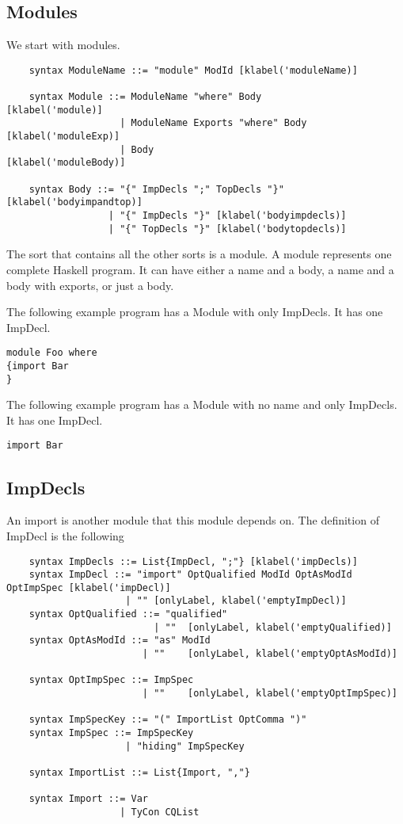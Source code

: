 \subsection{Modules}
We start with modules.
\begin{lstlisting}
    syntax ModuleName ::= "module" ModId [klabel('moduleName)]

    syntax Module ::= ModuleName "where" Body          [klabel('module)]
                    | ModuleName Exports "where" Body  [klabel('moduleExp)]
                    | Body                             [klabel('moduleBody)]

    syntax Body ::= "{" ImpDecls ";" TopDecls "}" [klabel('bodyimpandtop)]
                  | "{" ImpDecls "}" [klabel('bodyimpdecls)]
                  | "{" TopDecls "}" [klabel('bodytopdecls)]
\end{lstlisting}

The sort that contains all the other sorts is a module. A module represents one complete Haskell program. It can have either a name and a body, a name and a body with exports, or just a body.

The following example program has a Module with only ImpDecls. It has one ImpDecl.

\begin{lstlisting}
module Foo where
{import Bar
}
\end{lstlisting}

The following example program has a Module with no name and only ImpDecls. It has one ImpDecl.

\begin{lstlisting}
import Bar
\end{lstlisting}

\subsection{ImpDecls}
An import is another module that this module depends on.
The definition of ImpDecl is the following
\begin{lstlisting}
    syntax ImpDecls ::= List{ImpDecl, ";"} [klabel('impDecls)]
    syntax ImpDecl ::= "import" OptQualified ModId OptAsModId OptImpSpec [klabel('impDecl)]
                     | "" [onlyLabel, klabel('emptyImpDecl)]
    syntax OptQualified ::= "qualified"
                          | ""  [onlyLabel, klabel('emptyQualified)]
    syntax OptAsModId ::= "as" ModId
                        | ""    [onlyLabel, klabel('emptyOptAsModId)]

    syntax OptImpSpec ::= ImpSpec
                        | ""    [onlyLabel, klabel('emptyOptImpSpec)]

    syntax ImpSpecKey ::= "(" ImportList OptComma ")"
    syntax ImpSpec ::= ImpSpecKey
                     | "hiding" ImpSpecKey

    syntax ImportList ::= List{Import, ","}

    syntax Import ::= Var
                    | TyCon CQList
\end{lstlisting}

